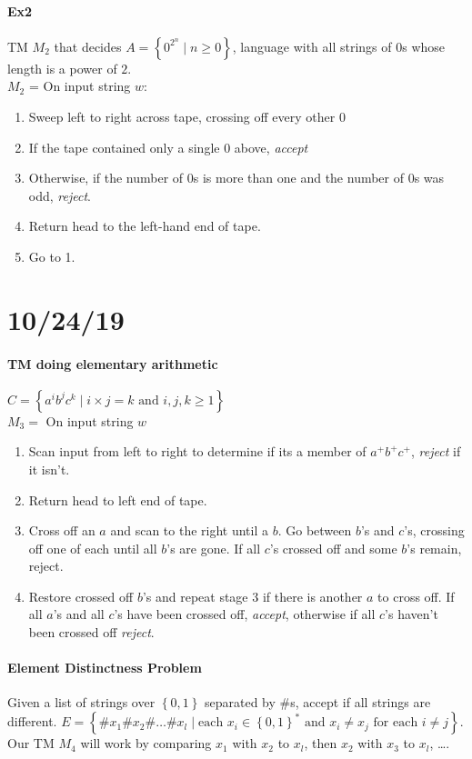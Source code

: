\documentclass[12 pt]{article}
\begin{document}
\paragraph{Ex2} TM $M_2$ that decides $A = \left\{0^{2^n} \mid n \geq
  0\right\}$, language with all strings of $0$s whose length is a
power of $2$.
\\ $M_2$ = On input string $w$:
\begin{enumerate}
\item Sweep left to right across tape, crossing off every other $0$
\item If the tape contained only a single $0$ above, \textit{accept}
\item Otherwise, if the number of $0$s is more than one and the number
  of $0$s was odd, \textit{reject}.
\item Return head to the left-hand end of tape.
\item Go to 1.
\end{enumerate}
\section{10/24/19}
\paragraph{TM doing elementary arithmetic} $C = \left\{a^i b^j c^k
  \mid i \times j = k \text{ and } i,j,k \geq 1\right\}$
\\ $M_3 = $ On input string $w$
\begin{enumerate}
\item Scan input from left to right to determine if its a member of
  $a^+b^+c^+$, \textit{reject} if it isn't.
\item Return head to left end of tape.
\item Cross off an $a$ and scan to the right until a $b$. Go between
  $b$'s and $c$'s, crossing off one of each until all $b$'s are
  gone. If all $c$'s crossed off and some $b$'s remain, reject.
\item Restore crossed off $b$'s and repeat stage $3$ if there is
  another $a$ to cross off. If all $a$'s and all $c$'s have been
  crossed off, \textit{accept}, otherwise if all $c$'s haven't been
  crossed off \textit{reject}.
\end{enumerate}
\paragraph{Element Distinctness Problem} Given a list of strings over
$\left\{0,1\right\}$ separated by $\#$s, accept if all strings are
different. $E = \left\{\# x_1 \# x_2 \# \ldots \# x_l \mid \text{each
  }x_i \in \left\{0,1\right\}^* \text{ and } x_i \neq x_j \text{ for
    each } i \neq j\right\}$. Our TM $M_4$ will work by comparing
$x_1$ with $x_2$ to $x_l$, then $x_2$ with $x_3$ to $x_l$, \ldots.
\end{document}
